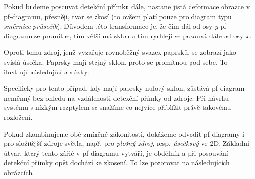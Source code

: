 Pokud budeme posouvat detekční přímku dále, nastane jistá deformace obrazce v pf-diagramu, přesněji, tvar se zkosí (to ovšem platí pouze pro diagram typu \emph{směrnice-průsečík}). Důvodem této transformace je, že čím dál od osy $y$ pf-diagramu se promítne, tím větší má sklon a tím rychleji se posouvá dále od osy $x$. 


Oproti tomu zdroj, jenž vyzařuje rovnoběžný svazek paprsků, se zobrazí jako svislá úsečka. Paprsky mají stejný sklon, proto se promítnou pod sebe. To ilustrují následující obrázky.



Specificky pro tento případ, kdy mají paprsky nulový sklon, zůstává pf-diagram neměnný bez ohledu na vzdálenosti detekční přímky od zdroje. Při návrhu systému s nízkým rozptylem se snažíme co nejvíce přiblížit právě takovému rozložení.

Pokud zkombinujeme obě zmíněné zákonitosti, dokážeme odvodit pf-diagramy i pro složitější zdroje světla, např. pro \emph{plošný zdroj}, resp. \emph{úsečkový} ve 2D. Základní útvar, který tento zářič v pf-diagramu vytváří, je obdélník a při posouvání detekční přímky opět dochází ke zkosení. To lze pozorovat na následujících obrázcích.


